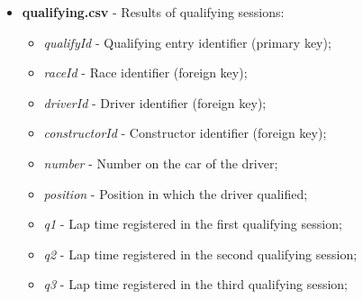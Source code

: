 \documentclass{Configuration_Files/PoliMi3i_thesis}
\begin{document}
\begin{itemize}
    \item \textbf{qualifying.csv} - Results of qualifying sessions:
    \begin{itemize}
        \item \textit{qualifyId} - Qualifying entry identifier (primary key);
        \item \textit{raceId} - Race identifier (foreign key);
        \item \textit{driverId} - Driver identifier (foreign key);
        \item \textit{constructorId} - Constructor identifier (foreign key);
        \item \textit{number} - Number on the car of the driver;
        \item \textit{position} - Position in which the driver qualified;
        \item \textit{q1} - Lap time registered in the first qualifying session;
        \item \textit{q2} - Lap time registered in the second qualifying session;
        \item \textit{q3} - Lap time registered in the third qualifying session;
    \end{itemize}


\end{itemize}
\end{document}
